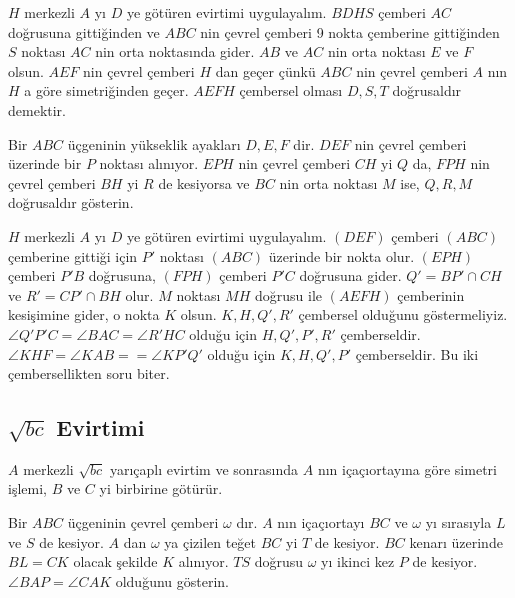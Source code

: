\documentclass[12pt]{scrartcl}
\begin{document}
\begin{answer*}
    $H$ merkezli $A$ yı $D$ ye götüren evirtimi uygulayalım. $BDHS$ çemberi $AC$ doğrusuna gittiğinden ve $ABC$ nin çevrel çemberi 9 nokta çemberine gittiğinden $S$ noktası $AC$ nin orta noktasında gider. $AB$ ve $AC$ nin orta noktası $E$ ve $F$ olsun. $AEF$ nin çevrel çemberi $H$ dan geçer çünkü $ABC$ nin çevrel çemberi $A$ nın $H$ a göre simetriğinden geçer. $AEFH$ çembersel olması $D,S,T$ doğrusaldır demektir.
\end{answer*}

\begin{problem}
    Bir $ABC$ üçgeninin yükseklik ayakları $D,E,F$ dir. $DEF$ nin çevrel çemberi üzerinde bir $P$ noktası alınıyor. $EPH$ nin çevrel çemberi $CH$ yi $Q$ da, $FPH$ nin çevrel çemberi $BH$ yi $R$ de kesiyorsa ve $BC$ nin orta noktası $M$ ise, $Q,R,M$ doğrusaldır gösterin.
\end{problem}

\begin{answer*}
    $H$ merkezli $A$ yı $D$ ye götüren evirtimi uygulayalım. $(DEF)$ çemberi $(ABC)$ çemberine gittiği için $P'$ noktası $(ABC)$ üzerinde bir nokta olur. $(EPH)$ çemberi $P'B$ doğrusuna, $(FPH)$ çemberi $P'C$ doğrusuna gider. $Q'=BP'\cap CH$ ve $R'=CP'\cap BH$ olur. $M$ noktası $MH$ doğrusu ile $(AEFH)$ çemberinin kesişimine gider, o nokta $K$ olsun. $K,H,Q',R'$ çembersel olduğunu göstermeliyiz. $\angle Q'P'C=\angle BAC=\angle R'HC$ olduğu için $H,Q',P',R'$ çemberseldir. $\angle KHF=\angle KAB==\angle KP'Q'$ olduğu için $K,H,Q',P'$ çemberseldir. Bu iki çembersellikten soru biter. 
\end{answer*}

\subsection*{$\sqrt{bc}$ Evirtimi}

$A$ merkezli $\sqrt{bc}$ yarıçaplı evirtim ve sonrasında $A$ nın içaçıortayına göre simetri işlemi, $B$ ve $C$ yi birbirine götürür.

\begin{problem}
    Bir $ABC$ üçgeninin çevrel çemberi $\omega$ dır. $A$ nın içaçıortayı $BC$ ve $\omega$ yı sırasıyla $L$ ve $S$ de kesiyor. $A$ dan $\omega$ ya çizilen teğet $BC$ yi $T$ de kesiyor. $BC$ kenarı üzerinde $BL=CK$ olacak şekilde $K$ alınıyor. $TS$ doğrusu $\omega$ yı ikinci kez $P$ de kesiyor. $\angle BAP=\angle CAK$ olduğunu gösterin.
\end{problem}
\end{document}
